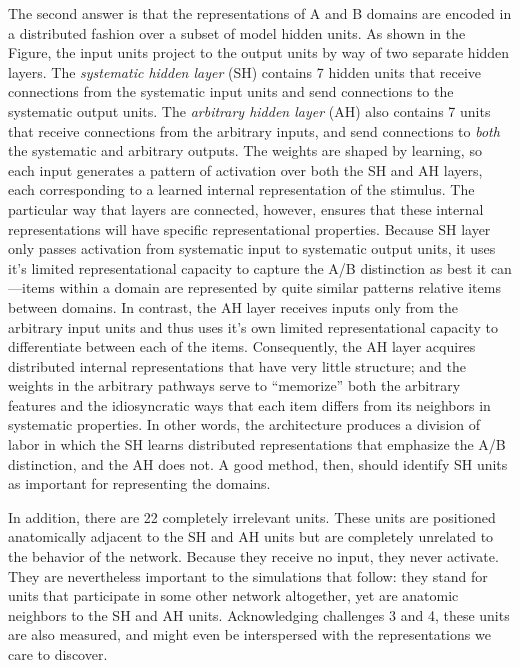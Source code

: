 The second answer is that the representations of A and B domains are encoded in a distributed fashion over a subset of model hidden units. As shown in the Figure, the input units project to the output units by way of two separate hidden layers. The {\em systematic hidden layer} (SH) contains 7 hidden units that receive connections from the systematic input units and send connections to the systematic output units. The {\em arbitrary hidden layer} (AH) also contains 7 units that receive connections from the arbitrary inputs, and send connections to {\em both} the systematic and arbitrary outputs.  The weights are shaped by learning, so each input generates a pattern of activation over both the SH and AH layers, each corresponding to a learned internal representation of the stimulus. The particular way that layers are connected, however, ensures that these internal representations will have specific representational properties. Because SH layer only passes activation from systematic input to systematic output units, it uses it's limited representational capacity to capture the A/B distinction as best it can---items within a domain are represented by quite similar patterns relative items between domains. In contrast, the AH layer receives inputs only from the arbitrary input units and thus uses it's own limited representational capacity to differentiate between each of the items. Consequently, the AH layer acquires distributed internal representations that have very little structure; and the weights in the arbitrary pathways serve to ``memorize'' both the arbitrary features and the idiosyncratic ways that each item differs from its neighbors in systematic properties. In other words, the architecture produces a division of labor in which the SH learns distributed representations that emphasize the A/B distinction, and the AH does not. A good method, then, should identify SH units as important for representing the domains.

In addition, there are 22 completely irrelevant units. These units are positioned anatomically adjacent to the SH and AH units but are completely unrelated to the behavior of the network. Because they receive no input, they never activate. They are nevertheless important to the simulations that follow: they stand for units that participate in some other network altogether, yet are anatomic neighbors to the SH and AH units. Acknowledging challenges 3 and 4, these units are also measured, and might even be interspersed with the representations we care to discover.

